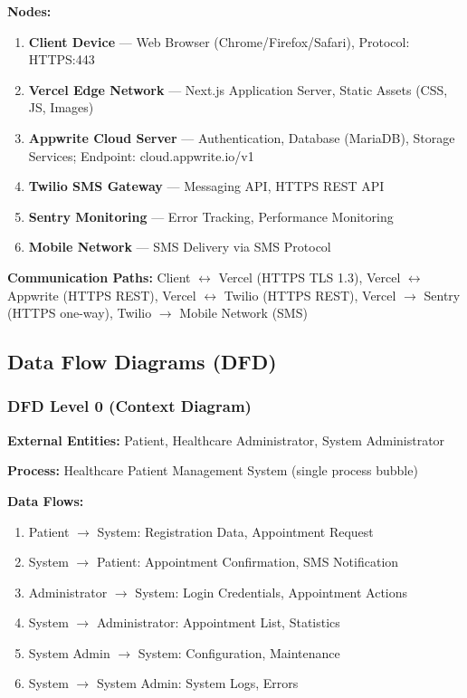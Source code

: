 \documentclass[11pt,a4paper]{article}
\begin{document}
\textbf{Nodes:}
\begin{enumerate}
    \item \textbf{Client Device} --- Web Browser (Chrome/Firefox/Safari), Protocol: HTTPS:443
    \item \textbf{Vercel Edge Network} --- Next.js Application Server, Static Assets (CSS, JS, Images)
    \item \textbf{Appwrite Cloud Server} --- Authentication, Database (MariaDB), Storage Services; Endpoint: cloud.appwrite.io/v1
    \item \textbf{Twilio SMS Gateway} --- Messaging API, HTTPS REST API
    \item \textbf{Sentry Monitoring} --- Error Tracking, Performance Monitoring
    \item \textbf{Mobile Network} --- SMS Delivery via SMS Protocol
\end{enumerate}

\textbf{Communication Paths:} Client $\leftrightarrow$ Vercel (HTTPS TLS 1.3), Vercel $\leftrightarrow$ Appwrite (HTTPS REST), Vercel $\leftrightarrow$ Twilio (HTTPS REST), Vercel $\rightarrow$ Sentry (HTTPS one-way), Twilio $\rightarrow$ Mobile Network (SMS)

\subsection{Data Flow Diagrams (DFD)}

\subsubsection{DFD Level 0 (Context Diagram)}

\textbf{External Entities:} Patient, Healthcare Administrator, System Administrator

\textbf{Process:} Healthcare Patient Management System (single process bubble)

\textbf{Data Flows:}
\begin{enumerate}
    \item Patient $\rightarrow$ System: Registration Data, Appointment Request
    \item System $\rightarrow$ Patient: Appointment Confirmation, SMS Notification
    \item Administrator $\rightarrow$ System: Login Credentials, Appointment Actions
    \item System $\rightarrow$ Administrator: Appointment List, Statistics
    \item System Admin $\rightarrow$ System: Configuration, Maintenance
    \item System $\rightarrow$ System Admin: System Logs, Errors
\end{enumerate}
\end{document}
